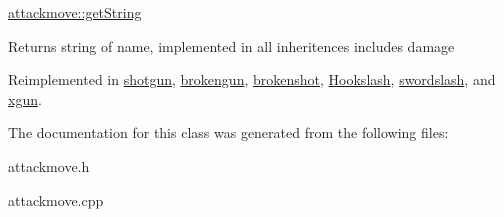 \hyperlink{classattackmove_ada49eedf4b893372c576edd48fe73161}{attackmove\-::get\-String} 

\begin{DoxyReturn}{Returns}
string of name, implemented in all inheritences includes damage 
\end{DoxyReturn}


Reimplemented in \hyperlink{classshotgun_a856fa8335ee3c2bb8603e83aa5629e5c}{shotgun}, \hyperlink{classbrokengun_af525de1fc249ff4fadec008b367881e9}{brokengun}, \hyperlink{classbrokenshot_a4834069bb57b3bb17a4816888cc83e43}{brokenshot}, \hyperlink{class_hookslash_aaf31aabb624b138d98f3c94fe1c37fcc}{Hookslash}, \hyperlink{classswordslash_ac58a7e3b969bb957548c55bdfd6a0b05}{swordslash}, and \hyperlink{classxgun_a8d091859d655ff1703630ba7dd88a358}{xgun}.



The documentation for this class was generated from the following files\-:\begin{DoxyCompactItemize}
\item 
attackmove.\-h\item 
attackmove.\-cpp\end{DoxyCompactItemize}
